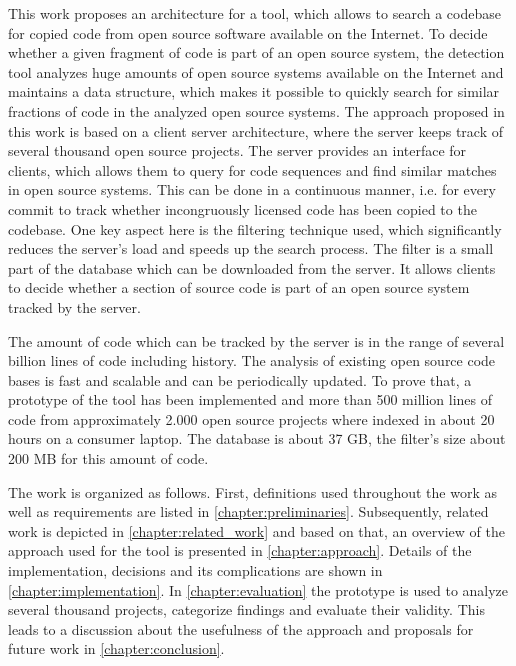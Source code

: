 This work proposes an architecture for a tool, which allows to search a codebase for copied code from open source software available on the Internet.
To decide whether a given fragment of code is part of an open source system, the detection tool analyzes huge amounts of open source systems available on the Internet and maintains a data structure, which makes it possible to quickly search for similar fractions of code in the analyzed open source systems.
The approach proposed in this work is based on a client server architecture, where the server keeps track of several thousand open source projects.
The server provides an interface for clients, which allows them to query for code sequences and find similar matches in open source systems.
This can be done in a continuous manner, i.e. for every commit to track whether incongruously licensed code has been copied to the codebase.
One key aspect here is the filtering technique used, which significantly reduces the server's load and speeds up the search process.
The filter is a small part of the database which can be downloaded from the server.
It allows clients to decide whether a section of source code is part of an open source system tracked by the server.


The amount of code which can be tracked by the server is in the range of several billion lines of code including history.
The analysis of existing open source code bases is fast and scalable and can be periodically updated.
To prove that, a prototype of the tool has been implemented and more than 500 million lines of code from approximately 2.000 open source projects where indexed in about 20 hours on a consumer laptop.
The database is about 37 GB, the filter's size about 200 MB for this amount of code.


The work is organized as follows.
First, definitions used throughout the work as well as requirements are listed in \autoref{chapter:preliminaries}.
Subsequently, related work is depicted in \autoref{chapter:related_work} and based on that, an overview of the approach used for the tool is presented in \autoref{chapter:approach}.
Details of the implementation, decisions and its complications are shown in \autoref{chapter:implementation}.
In \autoref{chapter:evaluation} the prototype is used to analyze several thousand projects, categorize findings and evaluate their validity.
This leads to a discussion about the usefulness of the approach and proposals for future work in \autoref{chapter:conclusion}.